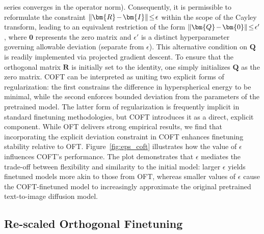 series converges in the operator norm). Consequently, it is permissible to reformulate the constraint $\thickmuskip=2mu \medmuskip=2mu\|\bm{R}-\bm{I}\|\leq\epsilon$ within the scope of the Cayley transform, leading to an equivalent restriction of the form $\thickmuskip=2mu \medmuskip=2mu \|\bm{Q}-\bm{0}\|\leq\epsilon'$, where $\bm{0}$ represents the zero matrix and $\epsilon'$ is a distinct hyperparameter governing allowable deviation (separate from $\epsilon$). This alternative condition on $\bm{Q}$ is readily implemented via projected gradient descent. To ensure that the orthogonal matrix $\bm{R}$ is initially set to the identity, one simply initializes $\bm{Q}$ as the zero matrix. COFT can be interpreted as uniting two explicit forms of regularization: the first constrains the difference in hyperspherical energy to be minimal, while the second enforces bounded deviation from the parameters of the pretrained model. The latter form of regularization is frequently implicit in standard finetuning methodologies, but COFT introduces it as a direct, explicit component. While OFT delivers strong empirical results, we find that incorporating the explicit deviation constraint in COFT enhances finetuning stability relative to OFT. Figure~\ref{fig:eps_coft} illustrates how the value of $\epsilon$ influences COFT's performance. The plot demonstrates that $\epsilon$ mediates the trade-off between flexibility and similarity to the initial model: larger $\epsilon$ yields finetuned models more akin to those from OFT, whereas smaller values of $\epsilon$ cause the COFT-finetuned model to increasingly approximate the original pretrained text-to-image diffusion model.

\subsection{Re-scaled Orthogonal Finetuning}

